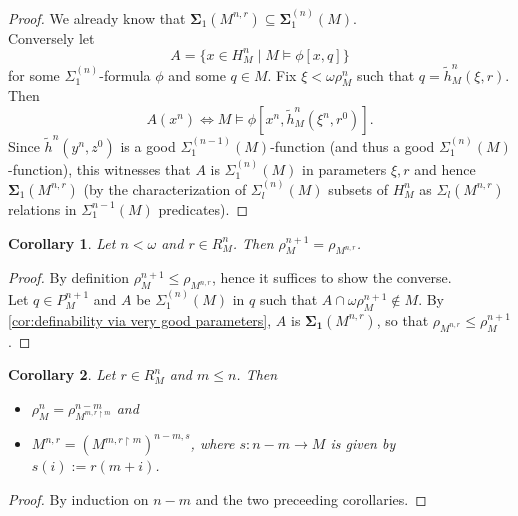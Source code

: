 \documentclass[12pt,a4paper]{article}
\theoremstyle{nicestyle}
\newtheorem{corollary}{Corollary}[subsection]
\begin{document}
\begin{proof}
  We already know that $\boldsymbol{\Sigma}_1(M^{n,r}) \subseteq \boldsymbol{\Sigma}^{(n)}_{1}(M)$. \\

  Conversely let
  \[
    A = \{ x \in H^{n}_{M} \mid M \models \phi[x, q] \}
  \]
  for some $\Sigma^{(n)}_{1}$-formula $\phi$ and some $q \in M$. Fix
  $\xi < \omega \rho^{n}_{M}$ such that
  $q = \tilde{h}^{n}_{M}(\xi, r)$. Then
  \[
    A(x^{n}) \iff M \models \phi[x^{n}, \tilde{h}^{n}_{M}(\xi^{n}, r^{0})].
  \]
  Since $\tilde{h}^{n}(y^{n}, z^{0})$ is a good
  $\Sigma^{(n-1)}_{1}(M)$-function (and thus a good
  $\Sigma^{(n)}_{1}(M)$-function), this witnesses that $A$ is
  $\Sigma^{(n)}_{1}(M)$ in parameters $\xi, r$ and hence
  $\boldsymbol{\Sigma}_{1}(M^{n,r})$ (by the characterization of
  $\Sigma^{(n)}_{l}(M)$ subsets of $H^{n}_{M}$ as
  $\Sigma_{l}(M^{n,r})$ relations in $\Sigma^{n-1}_{1}(M)$
  predicates).
\end{proof}

\begin{corollary}
  Let $n < \omega$ and $r \in R^{n}_{M}$. Then
  $\rho^{n+1}_{M} = \rho_{M^{n,r}}$.
\end{corollary}

\begin{proof}
  By definition $\rho^{n+1}_{M} \le \rho_{M^{n,r}}$, hence it suffices
  to show the converse. \\
  Let $q \in P^{n+1}_{M}$ and $A$ be $\Sigma^{(n)}_{1}(M)$ in $q$ such
  that $A \cap \omega\rho^{n+1}_{M} \not \in M$. By
  \autoref{cor:definability via very good parameters}, $A$ is
  $\boldsymbol{\Sigma_{1}}(M^{n,r})$, so that
  $\rho_{M^{n,r}} \le \rho^{n+1}_{M}$.
\end{proof}

\begin{corollary}
  Let $r \in R^{n}_{M}$ and $m \le n$. Then
  \begin{itemize}
  \item $\rho^{n}_{M} = \rho^{n-m}_{M^{m, r \restriction m}}$ and
  \item $M^{n, r} = (M^{m, r \restriction m})^{n-m, s}$, where
    $s \colon n-m \to M$ is given by $s(i) := r(m+i)$.
  \end{itemize}
\end{corollary}

\begin{proof}
  By induction on $n-m$ and the two preceeding corollaries.
\end{proof}
\end{document}
